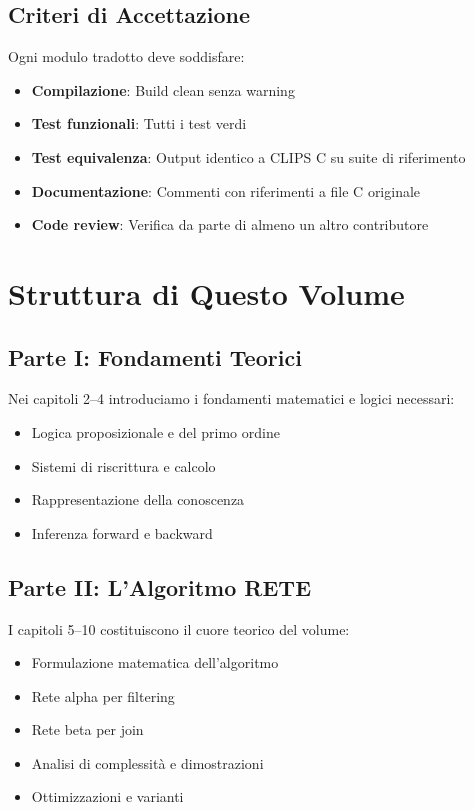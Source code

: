 \subsection{Criteri di Accettazione}

Ogni modulo tradotto deve soddisfare:

\begin{itemize}
\item \textbf{Compilazione}: Build clean senza warning
\item \textbf{Test funzionali}: Tutti i test verdi
\item \textbf{Test equivalenza}: Output identico a CLIPS C su suite di riferimento
\item \textbf{Documentazione}: Commenti con riferimenti a file C originale
\item \textbf{Code review}: Verifica da parte di almeno un altro contributore
\end{itemize}

\section{Struttura di Questo Volume}

\subsection{Parte I: Fondamenti Teorici}

Nei capitoli 2--4 introduciamo i fondamenti matematici e logici necessari:

\begin{itemize}
\item Logica proposizionale e del primo ordine
\item Sistemi di riscrittura e calcolo
\item Rappresentazione della conoscenza
\item Inferenza forward e backward
\end{itemize}

\subsection{Parte II: L'Algoritmo RETE}

I capitoli 5--10 costituiscono il cuore teorico del volume:

\begin{itemize}
\item Formulazione matematica dell'algoritmo
\item Rete alpha per filtering
\item Rete beta per join
\item Analisi di complessità e dimostrazioni
\item Ottimizzazioni e varianti
\end{itemize}

